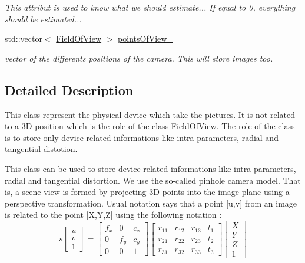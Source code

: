 \begin{DoxyCompactItemize}
\begin{DoxyCompactList}\small\item\em This attribut is used to know what we should estimate... If equal to 0, everything should be estimated... \end{DoxyCompactList}\item 
\hypertarget{class_opencv_sf_m_1_1_camera_aa12601d4d667646d9be47e5355eebe04}{
std::vector$<$ \hyperlink{class_opencv_sf_m_1_1_field_of_view}{FieldOfView} $>$ \hyperlink{class_opencv_sf_m_1_1_camera_aa12601d4d667646d9be47e5355eebe04}{pointsOfView\_\-}}
\label{class_opencv_sf_m_1_1_camera_aa12601d4d667646d9be47e5355eebe04}

\begin{DoxyCompactList}\small\item\em vector of the differents positions of the camera. This will store images too. \end{DoxyCompactList}\end{DoxyCompactItemize}


\subsection{Detailed Description}
This class represent the physical device which take the pictures. It is not related to a 3D position which is the role of the class \hyperlink{class_opencv_sf_m_1_1_field_of_view}{FieldOfView}. The role of the class is to store only device related informations like intra parameters, radial and tangential distotion. 

This class can be used to store device related informations like intra parameters, radial and tangential distortion. We use the so-\/called pinhole camera model. That is, a scene view is formed by projecting 3D points into the image plane using a perspective transformation. Usual notation says that a point \mbox{[}u,v\mbox{]} from an image is related to the point \mbox{[}X,Y,Z\mbox{]} using the following notation : \[ s \begin{bmatrix} u \\ v \\ 1 \end{bmatrix} = \begin{bmatrix}f_x & 0 & c_x \\ 0 & f_y & c_y \\ 0 & 0 & 1 \end{bmatrix} \begin{bmatrix} r_{11} & r_{12} & r_{13} & t_1 \\ r_{21} & r_{22} & r_{23} & t_2 \\ r_{31} & r_{32} & r_{33} & t_3 \end{bmatrix} \begin{bmatrix} X \\ Y \\ Z \\ 1 \end{bmatrix} \]

